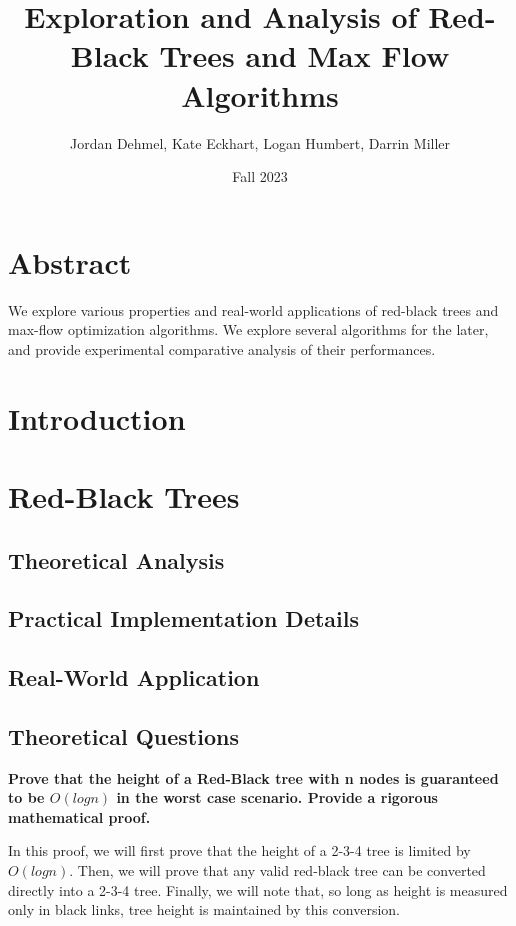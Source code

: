 \documentclass[12pt]{amsart}
\title{Exploration and Analysis of Red-Black Trees and Max Flow
    Algorithms}
\author{Jordan Dehmel, Kate Eckhart, Logan Humbert, Darrin Miller}
\date{Fall 2023}
\begin{document}
\maketitle

\tableofcontents

\section{Abstract}

    We explore various properties and real-world applications of
    red-black trees and max-flow optimization algorithms. We
    explore several algorithms for the later, and provide
    experimental comparative analysis of their performances.

\section{Introduction}

\section{Red-Black Trees}

\subsection{Theoretical Analysis}

\subsection{Practical Implementation Details}

\subsection{Real-World Application}

\subsection{Theoretical Questions}

    \textbf{Prove that the height of a Red-Black tree with
    n nodes is guaranteed to be $O(log n)$ in the worst
    case scenario. Provide a rigorous mathematical proof.}
    
    In this proof, we will first prove that the height of a
    2-3-4 tree is limited by $O(log n)$. Then, we will prove
    that any valid red-black tree can be converted directly into
    a 2-3-4 tree. Finally, we will note that, so long as height
    is measured only in black links, tree height is maintained
    by this conversion.
\end{document}
